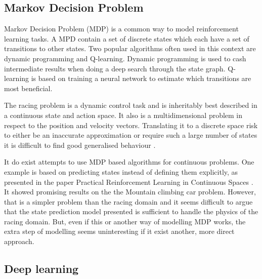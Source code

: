 \subsection{Markov Decision Problem}
Markov Decision Problem (MDP) is a common way to model reinforcement learning tasks. A MPD contain a set of discrete states which each have a set of transitions to other states. Two popular algorithms often used in this context are dynamic programming and Q-learning. Dynamic programming is used to cash intermediate results when doing a deep search through the state graph. Q-learning is based on training a neural network to estimate which transitions are most beneficial. 

The racing problem is a dynamic control task and is inheritably best described in a continuous state and action space. It also is a multidimensional problem in respect to the position and velocity vectors. Translating it to a discrete space risk to either be an inaccurate approximation or require such a large number of states it is difficult to find good generalised behaviour \cite{smart}. 

It do exist attempts to use MDP based algorithms for continuous problems. One example is based on predicting states instead of defining them explicitly, as presented in the paper Practical Reinforcement Learning in Continuous Spaces \cite{smart}. It showed promising results on the the Mountain climbing car problem. However, that is a simpler problem than the racing domain and it seems difficult to argue that the state prediction model presented is sufficient to handle the physics of the racing domain. But, even if this or another way of modelling MDP works, the extra step of modelling seems uninteresting if it exist another, more direct approach.

\subsection{Deep learning}


